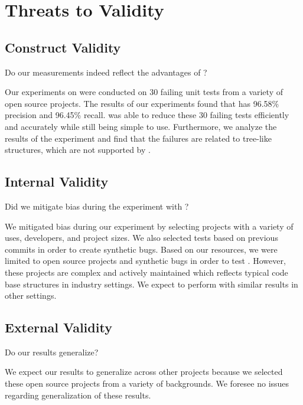 \clearpage %

\chapter{Threats to Validity}\label{CH7_ThreatsToValidity}

\section{Construct Validity}

Do our measurements indeed reflect the advantages of \mytool?

Our experiments on \mytool were conducted on 30 failing unit tests from a variety of open source projects. The results of our experiments found that \mytool has 96.58\% precision and 96.45\% recall. \mytool was able to reduce these 30 failing tests efficiently and accurately while still being simple to use. Furthermore, we analyze the results of the experiment and find that the failures are related to tree-like structures, which are not supported by \mytool.

\section{Internal Validity}

Did we mitigate bias during the experiment with \mytool?

We mitigated bias during our experiment by selecting projects with a variety of uses, developers, and project sizes. We also selected tests based on previous commits in order to create synthetic bugs. Based on our resources, we were limited to open source projects and synthetic bugs in order to test \mytool. However, these projects are complex and actively maintained which reflects typical code base structures in industry settings. We expect \mytool to perform with similar results in other settings.

\section{External Validity}

Do our results generalize?

We expect our results to generalize across other projects because we selected these open source projects from a variety of backgrounds. We foresee no issues regarding generalization of these results.

